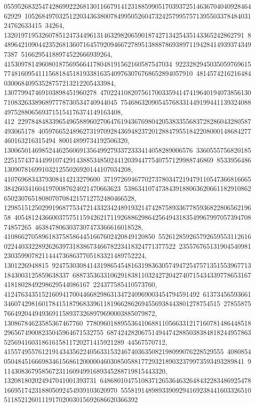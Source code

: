 {{{05595268325474286992226813011667914123188599051703937251463670404092846462929\
10526849703251220343638007849950526047324257995757139550337848403124762633415\
34264, 1320197195326078512473449613146329820659018742713425435143365242862791\
84896421090442352681360716457920946672789513888786938971194284149393743497387\
51662954188974522666939264, 4153097814960801875695664178048191562160587547034\
92232829450350597696157748160954111568184518193381635409763076768652894057910\
481457421621648403006840953528757213212205433984, 130779947469103898451960278\
47022410820756170033594147419640194073856130710832633896897778730534740944045\
754686320905457683314491994411393240884975288065693715154176374149163408, 412\
22978484833965496588960270647619436769804205383355683728286043280587493065178\
40597665248962731970928436948237201288479551842208000148684277460163216315494\
80014899734192506320, 1300650146985244625606913564992793372333414058289006576\
33605557568201852251574374449910742914388534850244120394477540757129988746869\
85339564861309078169910321255026920144107034208, 4107696834379308414213279600\
37197269467702737803472194791105473668166653842603416041970087624021470663623\
538634107473843918806362066118291086265023076518080707084215712752480466528, 
   12985151250299196877534721433234248919321474287589336778593682280656219658\
40548124366003757511594262171192688629864256494318354996799705739470874857265\
4638478063037307473366616018528, 41086627058961837585864451667602420849120850\
55261285926579265955311261602244033228926263973183867346678223418324771377522\
23557676513190454098123035990782114447368637705183321489752224, 1301226948815\
92475303084143198654548163198363057494725475713515539677131843003125859638337\
68873536331062918381103242720427407154343397786531674181802849298629544086167\
224377585410573760, 412476343515216094170044668298631347240969003454794591492\
61373456593661346074298160178415187968339611819662862694556938443801278754515\
2785587576649204494936911589373268979690003885079872, 13086784623585367467760\
77809601889553641068811056633121716078148644851829656749008235045964671532755\
68742428206751494474288503838481824495786352569416031861615811720271415921289\
44567570712, 4155749557612191434356224056331532467403635082198099076228529555\
40808540504845166698346156861200000460308505881772932189032379973593493289841\
911430836795856723116094991689345288719815443320, 132081802024947041001393731\
64868010475108371265364632648432283486925478166951742318805092454939103620970\
55581914898933909294169238441603326510511852126011191702003015692686620366392\
}}}
